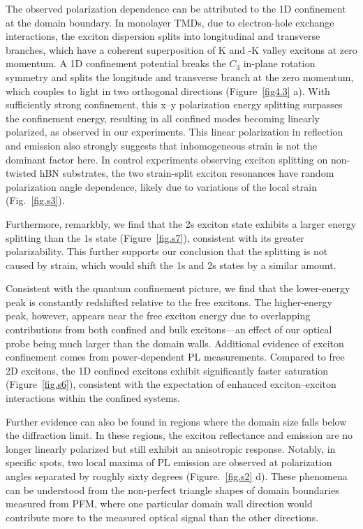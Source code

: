 The observed polarization dependence can be attributed to the 1D confinement at the domain boundary. 
In monolayer TMDs, due to electron-hole exchange interactions, the exciton dispersion splits into longitudinal and transverse branches, which have a coherent superposition of K and -K valley excitons at zero momentum\cite{Yu2014-gi}.
A 1D confinement potential breaks the $C_3$ in-plane rotation symmetry and splits the longitude and transverse branch at the zero momentum, which couples to light in two orthogonal directions \cite{Glazov2015-us,Yu2015-br,Qiu2015-vl} (Figure~\ref{fig4.3} a).
With sufficiently strong confinement, this x–y polarization energy splitting surpasses the confinement energy, resulting in all confined modes becoming linearly polarized, as observed in our experiments. 
This linear polarization in reflection and emission also strongly suggests that inhomogeneous strain is not the dominant factor here. 
In control experiments observing exciton splitting on non-twisted hBN substrates, the two strain-split exciton resonances have random polarization angle dependence, likely due to variations of the local strain (Fig.~\ref{fig.s3}). 

Furthermore, remarkbly, we find that the 2s exciton state exhibits a larger energy splitting than the 1s state (Figure~\ref{fig.s7}), consistent with its greater polarizability. 
This further supports our conclusion that the splitting is not caused by strain, which would shift the 1s and 2s states by a similar amount.

Consistent with the quantum confinement picture, we find that the lower-energy peak is constantly redshifted relative to the free excitons. 
The higher-energy peak, however, appears near the free exciton energy due to overlapping contributions from both confined and bulk excitons—an effect of our optical probe being much larger than the domain walls.
Additional evidence of exciton confinement comes from power-dependent PL measurements. 
Compared to free 2D excitons, the 1D confined excitons exhibit significantly faster saturation (Figure~\ref{fig.s6}), consistent with the expectation of enhanced exciton–exciton interactions within the confined systems.

Further evidence can also be found in regions where the domain size falls below the diffraction limit. 
In these regions, the exciton reflectance and emission are no longer linearly polarized but still exhibit an anisotropic response. 
Notably, in specific spots, two local maxima of PL emission are observed at polarization angles separated by roughly sixty degrees (Figure.~\ref{fig.s2} d). 
These phenomena can be understood from the non-perfect triangle shapes of domain boundaries measured from PFM, where one particular domain wall direction would contribute more to the measured optical signal than the other directions.

